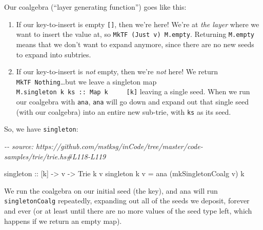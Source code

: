 \documentclass[]{article}
\newenvironment{Shaded}{}{}
\newcommand{\CharTok}[1]{\textcolor[rgb]{0.25,0.44,0.63}{#1}}
\newcommand{\CommentTok}[1]{\textcolor[rgb]{0.38,0.63,0.69}{\textit{#1}}}
\newcommand{\DataTypeTok}[1]{\textcolor[rgb]{0.56,0.13,0.00}{#1}}
\newcommand{\DecValTok}[1]{\textcolor[rgb]{0.25,0.63,0.44}{#1}}
\newcommand{\NormalTok}[1]{#1}
\newcommand{\OperatorTok}[1]{\textcolor[rgb]{0.40,0.40,0.40}{#1}}
\newcommand{\OtherTok}[1]{\textcolor[rgb]{0.00,0.44,0.13}{#1}}
\newcommand{\StringTok}[1]{\textcolor[rgb]{0.25,0.44,0.63}{#1}}
\begin{document}
Our coalgebra (``layer generating function'') goes like this:

\begin{enumerate}
\def\labelenumi{\arabic{enumi}.}
\item
  If our key-to-insert is empty \texttt{{[}{]}}, then we're here! We're at
  \emph{the layer} where we want to insert the value at, so
  \texttt{MkTF\ (Just\ v)\ M.empty}. Returning \texttt{M.empty} means that we
  don't want to expand anymore, since there are no new seeds to expand into
  subtries.
\item
  If our key-to-insert is \emph{not} empty, then we're \emph{not} here! We
  return \texttt{MkTF\ Nothing}\ldots but we leave a singleton map
  \texttt{M.singleton\ k\ ks\ ::\ Map\ k\ \ \ \ \ {[}k{]}} leaving a single
  seed. When we run our coalgebra with \texttt{ana}, \texttt{ana} will go down
  and expand out that single seed (with our coalgebra) into an entire new
  sub-trie, with \texttt{ks} as its seed.
\end{enumerate}

So, we have \texttt{singleton}:

\begin{Shaded}
\begin{Highlighting}[]
\CommentTok{{-}{-} source: https://github.com/mstksg/inCode/tree/master/code{-}samples/trie/trie.hs\#L118{-}L119}

\OtherTok{singleton ::}\NormalTok{ [k] }\OtherTok{{-}\textgreater{}}\NormalTok{ v }\OtherTok{{-}\textgreater{}} \DataTypeTok{Trie}\NormalTok{ k v}
\NormalTok{singleton k v }\OtherTok{=}\NormalTok{ ana (mkSingletonCoalg v) k}
\end{Highlighting}
\end{Shaded}

We run the coalgebra on our initial seed (the key), and ana will run
\texttt{singletonCoalg} repeatedly, expanding out all of the seeds we deposit,
forever and ever (or at least until there are no more values of the seed type
left, which happens if we return an empty map).

\begin{Shaded}
\end{Shaded}
\end{document}
